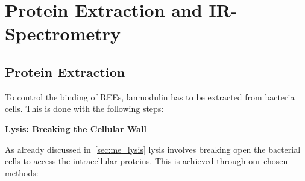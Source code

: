 \chapter{Protein Extraction and IR-Spectrometry\authorB{}}
\section{Protein Extraction}
To control the binding of REEs, lanmodulin has to be extracted from bacteria cells.
This is done with the following steps:

\textbf{Lysis: Breaking the Cellular Wall}

As already discussed in~\ref{sec:me_lysis} lysis involves breaking open the bacterial cells to access the intracellular proteins.
This is achieved through our chosen methods:

